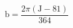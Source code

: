 \documentclass[12pt]{article}
\begin{document}
\begin{displaymath}
\mathrm{b}=\frac{2 \pi(\mathrm{J}-81)}{364}
\end{displaymath}
\end{document}
